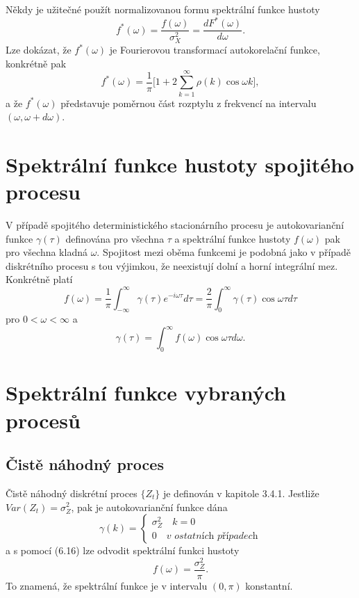 Někdy je užitečné použít normalizovanou formu spektrální funkce hustoty
\begin{equation}
f^*(\omega) = \frac{f(\omega)}{\sigma_X^2} = \frac{dF^*(\omega)}{d \omega}.
\end{equation}
Lze dokázat, že $f^*(\omega)$ je Fourierovou transformací autokorelační funkce, konkrétně pak
\begin{equation}
f^*(\omega) = \frac{1}{\pi}\Big[1 + 2 \sum_{k = 1}^{\infty} \rho(k) \cos \omega k \Big],
\end{equation}
a že $f^*(\omega)$ představuje poměrnou část rozptylu z frekvencí na intervalu $(\omega, \omega + d\omega)$.

\section{Spektrální funkce hustoty spojitého procesu}

V případě spojitého deterministického stacionárního procesu je autokovarianční funkce $\gamma(\tau)$ definována pro všechna $\tau$ a spektrální funkce hustoty $f(\omega)$ pak pro všechna kladná $\omega$. Spojitost mezi oběma funkcemi je podobná jako v případě diskrétního procesu s tou výjimkou, že neexistují dolní a horní integrální mez. Konkrétně platí
\begin{equation}
f(\omega) = \frac{1}{\pi} \int_{-\infty}^{\infty} \gamma(\tau) e^{-i \omega \tau} d \tau = \frac{2}{\pi} \int_0^{\infty} \gamma(\tau) \cos \omega \tau d \tau
\end{equation}
pro $0 < \omega < \infty$ a
\begin{equation}
\gamma(\tau) = \int_0^{\infty} f(\omega) \cos \omega \tau d \omega.
\end{equation}

\section{Spektrální funkce vybraných procesů}

\subsection{Čistě náhodný proces}

Čistě náhodný diskrétní proces $\{Z_t\}$ je definován v kapitole 3.4.1. Jestliže $Var(Z_t) = \sigma_Z^2$, pak je autokovarianční funkce dána
\begin{equation}
\gamma(k) =
\begin{cases}
\sigma^2_Z \quad k = 0\\
0 \quad \textit{v ostatních případech}
\end{cases}
\end{equation}
a s pomocí (6.16) lze odvodit spektrální funkci hustoty
\begin{equation}
f(\omega) = \frac{\sigma^2_Z}{\pi}.
\end{equation}
To znamená, že spektrální funkce je v intervalu $(0, \pi)$ konstantní.

